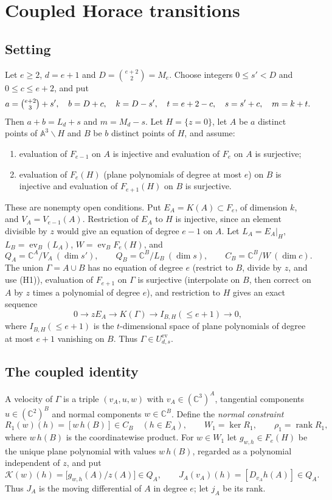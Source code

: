 \documentclass{amsart}
\theoremstyle{definition}
\theoremstyle{remark}
\numberwithin{equation}{section}
\newcommand{\CC}{\mathbb{C}}
\newcommand{\A}{\mathbb{A}}
\DeclareMathOperator{\ev}{ev}
\DeclareMathOperator{\rank}{rank}
\begin{document}
\section{Coupled Horace transitions}\label{sec:horace}

\subsection{Setting}\label{sec:horacesetting}
Let $e\ge2$, $d=e+1$ and $D=\binom{e+2}2=M_e$. Choose integers $0\le s'<D$ and
$0\le c\le e+2$, and put
\[
  a=\tbinom{e+2}3+s',\quad b=D+c,\quad k=D-s',\quad t=e+2-c,\quad s=s'+c,\quad m=k+t .
\]
Then $a+b=L_d+s$ and $m=M_d-s$. Let $H=\{z=0\}$, let $A$ be $a$ distinct points of
$\A^3\smallsetminus H$ and $B$ be $b$ distinct points of $H$, and assume:
\begin{enumerate}[label=(H\arabic*)]
\item evaluation of $F_{e-1}$ on $A$ is injective and evaluation of $F_e$ on $A$ is
surjective;
\item evaluation of $F_e(H)$ (plane polynomials of degree at most $e$) on $B$ is
injective and evaluation of $F_{e+1}(H)$ on $B$ is surjective.
\end{enumerate}
These are nonempty open conditions. Put $E_A=K(A)\subset F_e$, of dimension $k$, and
$V_A=V_{e-1}(A)$. Restriction of $E_A$ to $H$ is injective, since an element divisible
by $z$ would give an equation of degree $e-1$ on $A$. Let
$L_A=E_A|_H$, $L_B=\ev_B(L_A)$, $W=\ev_B F_e(H)$, and
\[
  Q_A=\CC^A/V_A\ (\dim s'),\qquad Q_B=\CC^B/L_B\ (\dim s),\qquad C_B=\CC^B/W\ (\dim c).
\]
The union $\Gamma=A\cup B$ has no equation of degree $e$ (restrict to $B$, divide by
$z$, and use (H1)), evaluation of $F_{e+1}$ on $\Gamma$ is surjective (interpolate on
$B$, then correct on $A$ by $z$ times a polynomial of degree $e$), and restriction to
$H$ gives an exact sequence
\begin{equation}\label{eq:horaceseq}
  0\to zE_A\to K(\Gamma)\to I_{B,H}(\le e+1)\to0,
\end{equation}
where $I_{B,H}(\le e+1)$ is the $t$-dimensional space of plane polynomials of degree at
most $e+1$ vanishing on $B$. Thus $\Gamma\in U^{\mathrm{ev}}_{d,s}$.

\subsection{The coupled identity}
A velocity of $\Gamma$ is a triple $(v_A,u,w)$ with $v_A\in(\CC^3)^A$, tangential
components $u\in(\CC^2)^B$ and normal components $w\in\CC^B$. Define the \emph{normal
constraint}
\[
  R_1(w)(h)=[w\,h(B)]\in C_B\quad(h\in E_A),\qquad W_1=\ker R_1,\qquad\rho_1=\rank R_1 ,
\]
where $w\,h(B)$ is the coordinatewise product. For $w\in W_1$ let
$g_{w,h}\in F_e(H)$ be the unique plane polynomial with values $w\,h(B)$, regarded as a
polynomial independent of $z$, and put
\[
  \mathcal K(w)(h)=\bigl[g_{w,h}(A)/z(A)\bigr]\in Q_A,\qquad
  J_A(v_A)(h)=[D_{v_A}h(A)]\in Q_A .
\]
Thus $J_A$ is the moving differential of $A$ in degree $e$; let $j_A$ be its rank.
\end{document}
